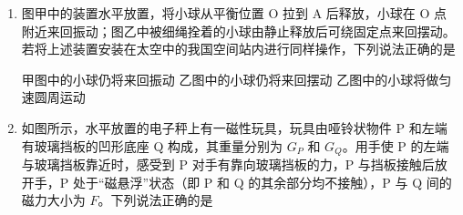 \documentclass[\gkver]{gaokaozhenti}
\begin{document}
\begin{enumerate}
{	$T\cos\theta=f$

	$f=\mu N$

	$T\sin\theta+N=mg$

	联立解得 $T=\frac{\mu mg}{\cos\theta+\mu\sin\theta}$，故 A 错误，B 正确；

	C．拉力的大小为

	$T=\frac{\mu mg}{\cos\theta+\mu\sin\theta}=\frac{\mu mg}{\sqrt{1+\mu^{2}}\sin(\theta+\varphi)}$

	其中 $\tan\varphi=\mu$，可知当 $\theta+\varphi=90^{\circ}$ 时，拉力有最小值，即减小夹角 $\theta$，轻绳的合拉力不一定减小，故 C 错误；

	D．摩擦力大小为

	$f=T\cos\theta=\frac{\mu mg\cos\theta}{\cos\theta+\mu\sin\theta}=\frac{\mu mg}{1+\mu\tan\theta}$

	可知增大夹角 $\theta$，摩擦力一直减小，当 $\theta$ 趋近于 $90^{\circ}$ 时，摩擦力最小，故轻绳的合拉力最小时，地面对石墩的摩擦力不是最小，故 D 错误；

	故选 B。
}

\item
图甲中的装置水平放置，将小球从平衡位置 O 拉到 A 后释放，小球在 O 点附近来回振动；图乙中被细绳拴着的小球由静止释放后可绕固定点来回摆动。若将上述装置安装在太空中的我国空间站内进行同样操作，下列说法正确的是 


{甲图中的小球仍将来回振动}
{乙图中的小球仍将来回摆动}
{乙图中的小球将做匀速圆周运动}


\item
如图所示，水平放置的电子秤上有一磁性玩具，玩具由哑铃状物件 P 和左端有玻璃挡板的凹形底座 Q 构成，其重量分别为 $G_{P}$ 和 $G_{Q}$。用手使 P 的左端与玻璃挡板靠近时，感受到 P 对手有靠向玻璃挡板的力，P 与挡板接触后放开手，P 处于“磁悬浮”状态（即 P 和 Q 的其余部分均不接触），P 与 Q 间的磁力大小为 $F$。下列说法正确的是 


\end{enumerate}
\end{document}
